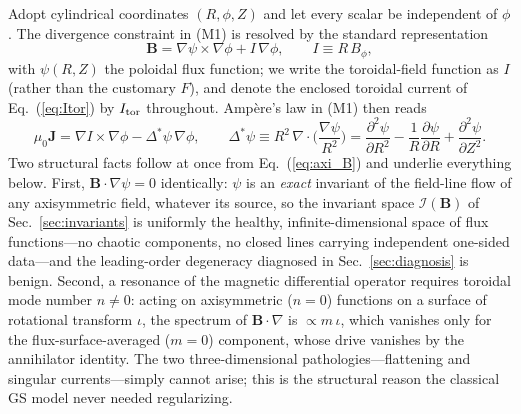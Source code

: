 \documentclass[english]{article}
\newcommand{\bB}{\mathbf{B}}
\newcommand{\bJ}{\mathbf{J}}
\begin{document}
Adopt cylindrical coordinates $(R,\phi,Z)$ and let every scalar be independent of $\phi$. The
divergence constraint in (M1) is resolved by the standard representation
\begin{equation}
\bB=\nabla\psi\times\nabla\phi+I\,\nabla\phi ,
\qquad I\equiv R\,B_\phi ,
\label{eq:axi_B}
\end{equation}
with $\psi(R,Z)$ the poloidal flux function; we write the toroidal-field function as $I$ (rather
than the customary $F$), and denote the enclosed toroidal current of Eq.~(\ref{eq:Itor}) by
$I_{\rm tor}$ throughout. Amp\`ere's law in (M1) then reads
\begin{equation}
\mu_0\bJ=\nabla I\times\nabla\phi-\Delta^*\psi\,\nabla\phi ,
\qquad
\Delta^*\psi\equiv R^{2}\,\nabla\cdot\!\Big(\frac{\nabla\psi}{R^{2}}\Big)
=\frac{\partial^{2}\psi}{\partial R^{2}}-\frac1R\frac{\partial\psi}{\partial R}
+\frac{\partial^{2}\psi}{\partial Z^{2}} .
\label{eq:axi_ampere}
\end{equation}
Two structural facts follow at once from Eq.~(\ref{eq:axi_B}) and underlie everything below.
First, $\bB\cdot\nabla\psi=0$ identically: $\psi$ is an \emph{exact} invariant of the field-line
flow of any axisymmetric field, whatever its source, so the invariant space $\mathcal I(\bB)$ of
Sec.~\ref{sec:invariants} is uniformly the healthy, infinite-dimensional space of flux
functions---no chaotic components, no closed lines carrying independent one-sided data---and the
leading-order degeneracy diagnosed in Sec.~\ref{sec:diagnosis} is benign. Second, a resonance of
the magnetic differential operator requires toroidal mode number $n\neq0$: acting on axisymmetric
($n=0$) functions on a surface of rotational transform $\iota$, the spectrum of $\bB\cdot\nabla$
is $\propto m\,\iota$, which vanishes only for the flux-surface-averaged ($m=0$) component, whose
drive vanishes by the annihilator identity. The two three-dimensional pathologies---flattening and
singular currents---simply cannot arise; this is the structural reason the classical GS model
never needed regularizing.
\end{document}
